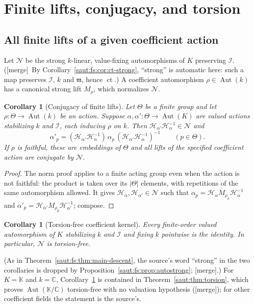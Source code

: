 \documentclass[11pt]{article}
\newtheorem{corollary}[theorem]{Corollary}
\theoremstyle{definition}
\theoremstyle{remark}
\newcommand{\C}{\mathbb C}
\newcommand{\K}{\mathbb K}
\newcommand{\mm}{\mathfrak m}
\newcommand{\Aut}{\operatorname{Aut}}
\newcommand{\ct}{\operatorname{ct}}
\newcommand{\Ineg}{\mathcal I}
\newcommand{\mergetag}{\textup{[merge]}}
\numberwithin{equation}{section}
\begin{document}
\section{Finite lifts, conjugacy, and torsion}\label{saut:fs:sec:group}

\subsection{All finite lifts of a given coefficient action}

Let $\mathcal N$ be the strong $k$-linear, value-fixing automorphisms of $K$
preserving $\Ineg$. (\mergetag\ By Corollary~\ref{saut:fs:cor:ct-strong}, ``strong''
is automatic here: such a map preserves $\Ineg$, $k$ and $\mm$, hence $\ct$.) A
coefficient automorphism $\rho\in\Aut(k)$ has a canonical strong lift $M_\rho$,
which normalizes $\mathcal N$.

\begin{corollary}[Conjugacy of finite lifts]\label{saut:fs:cor:lifts}
Let $\Theta$ be a finite group and let $\rho:\Theta\to\Aut(k)$ be an action.
Suppose $\alpha,\alpha':\Theta\to\Aut(K)$ are valued actions stabilizing $k$ and
$\Ineg$, each inducing $\rho$ on $k$. Then $\mathcal H_{\alpha'}\mathcal
H_\alpha^{-1}\in\mathcal N$ and
\[
 \alpha'_p=(\mathcal H_{\alpha'}\mathcal H_\alpha^{-1})\,\alpha_p\,
 (\mathcal H_{\alpha'}\mathcal H_\alpha^{-1})^{-1}\qquad(p\in\Theta).
\]
If $\rho$ is faithful, these are embeddings of $\Theta$ and all lifts of the
specified coefficient action are conjugate by $\mathcal N$.
\end{corollary}
\begin{proof}
The norm proof applies to a finite acting group even when the action is not
faithful: the product is taken over its $|\Theta|$ elements, with repetitions of the
same automorphism allowed. It gives $\mathcal H_\alpha,\mathcal H_{\alpha'}\in\mathcal
N$ such that $\alpha_p=\mathcal H_\alpha M_{\rho_p}\mathcal H_\alpha^{-1}$ and
$\alpha'_p=\mathcal H_{\alpha'}M_{\rho_p}\mathcal H_{\alpha'}^{-1}$; compose.
\end{proof}

\begin{corollary}[Torsion-free coefficient kernel]\label{saut:fs:cor:torsion}
Every finite-order valued automorphism of $K$ stabilizing $k$ and $\Ineg$ and fixing
$k$ pointwise is the identity. In particular, $\mathcal N$ is torsion-free.
\end{corollary}

(As in Theorem~\ref{saut:fs:thm:main-descent}, the source's word ``strong'' in the
two corollaries is dropped by Proposition~\ref{saut:fs:prop:autostrong}; \mergetag.)
For $K=\K$ and $k=\C$, Corollary~\ref{saut:fs:cor:torsion} is contained in
Theorem~\ref{saut:thm:torsion}, which proves $\Aut(\K/\C)$ torsion-free with no
valuation hypothesis (\mergetag); for other coefficient fields the statement is the
source's.
\end{document}
